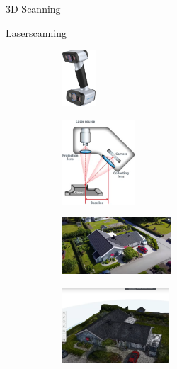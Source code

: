 \begin{frame}{3D Scanning}
    \begin{block}{Laserscanning}
     \begin{figure}[t]
        \centering
        \begin{minipage}[m]{0.3\textwidth}
        \begin{figure}
            \centering
            \includegraphics[height=60pt]{img_niklas/shining-3d-einscan-hx-software-bundle-solid-edge-essentials-1-stk-338985-de.png}
            \label{fig:my_label}
        \end{figure}
        \begin{figure}[b]
            \centering
            \includegraphics[height=90pt]{img_niklas/3d-scanning-101_9.jpg}
            \label{fig:my_label}
        \end{figure}
        \end{minipage}
        \hfill
        \begin{minipage}[m]{0.3\textwidth}
         \begin{figure}
            \centering
            \includegraphics[height=60pt]{img_niklas/3dprintingaHouse.PNG}
            \label{fig:my_label}
        \end{figure}
        \begin{figure}[b]
            \centering
            \includegraphics[height=80pt]{img_niklas/3dprintingaHouse2.PNG}

\end{figure}
\end{minipage}
\end{figure}
\end{block}
\end{frame}
